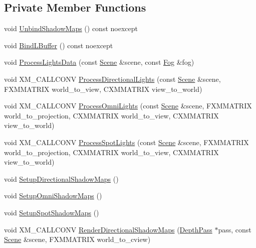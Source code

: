 \subsection*{Private Member Functions}
\begin{DoxyCompactItemize}
\item 
void \hyperlink{structmage_1_1_l_buffer_pass_af7abbf24eb7d20d9604beca5baa71f20}{Unbind\+Shadow\+Maps} () const noexcept
\item 
void \hyperlink{structmage_1_1_l_buffer_pass_a1ed227fef9a19d8274519c8ff6277e35}{Bind\+L\+Buffer} () const noexcept
\item 
void \hyperlink{structmage_1_1_l_buffer_pass_a5da38ff4cf2d1de37fb40f8923b1d9bf}{Process\+Lights\+Data} (const \hyperlink{classmage_1_1_scene}{Scene} \&scene, const \hyperlink{classmage_1_1_fog}{Fog} \&fog)
\item 
void X\+M\+\_\+\+C\+A\+L\+L\+C\+O\+NV \hyperlink{structmage_1_1_l_buffer_pass_a731613105a25fbae8560954e1b3b78fe}{Process\+Directional\+Lights} (const \hyperlink{classmage_1_1_scene}{Scene} \&scene, F\+X\+M\+M\+A\+T\+R\+IX world\+\_\+to\+\_\+view, C\+X\+M\+M\+A\+T\+R\+IX view\+\_\+to\+\_\+world)
\item 
void X\+M\+\_\+\+C\+A\+L\+L\+C\+O\+NV \hyperlink{structmage_1_1_l_buffer_pass_a6c33b00709c8440dbe3e1d37f6e0269a}{Process\+Omni\+Lights} (const \hyperlink{classmage_1_1_scene}{Scene} \&scene, F\+X\+M\+M\+A\+T\+R\+IX world\+\_\+to\+\_\+projection, C\+X\+M\+M\+A\+T\+R\+IX world\+\_\+to\+\_\+view, C\+X\+M\+M\+A\+T\+R\+IX view\+\_\+to\+\_\+world)
\item 
void X\+M\+\_\+\+C\+A\+L\+L\+C\+O\+NV \hyperlink{structmage_1_1_l_buffer_pass_a6886e49e2611592a73fc76cd4e4af307}{Process\+Spot\+Lights} (const \hyperlink{classmage_1_1_scene}{Scene} \&scene, F\+X\+M\+M\+A\+T\+R\+IX world\+\_\+to\+\_\+projection, C\+X\+M\+M\+A\+T\+R\+IX world\+\_\+to\+\_\+view, C\+X\+M\+M\+A\+T\+R\+IX view\+\_\+to\+\_\+world)
\item 
void \hyperlink{structmage_1_1_l_buffer_pass_aa6a3dd241588a460e2ea51f6cec14aeb}{Setup\+Directional\+Shadow\+Maps} ()
\item 
void \hyperlink{structmage_1_1_l_buffer_pass_a530276d14da57710e5182abda48982d4}{Setup\+Omni\+Shadow\+Maps} ()
\item 
void \hyperlink{structmage_1_1_l_buffer_pass_a1ed3d550173e0145e363132656b8dfdb}{Setup\+Spot\+Shadow\+Maps} ()
\item 
void X\+M\+\_\+\+C\+A\+L\+L\+C\+O\+NV \hyperlink{structmage_1_1_l_buffer_pass_a8fc35d37df15125c8f50df9de7bf885d}{Render\+Directional\+Shadow\+Maps} (\hyperlink{classmage_1_1_depth_pass}{Depth\+Pass} $\ast$pass, const \hyperlink{classmage_1_1_scene}{Scene} \&scene, F\+X\+M\+M\+A\+T\+R\+IX world\+\_\+to\+\_\+cview)

\end{DoxyCompactItemize}
